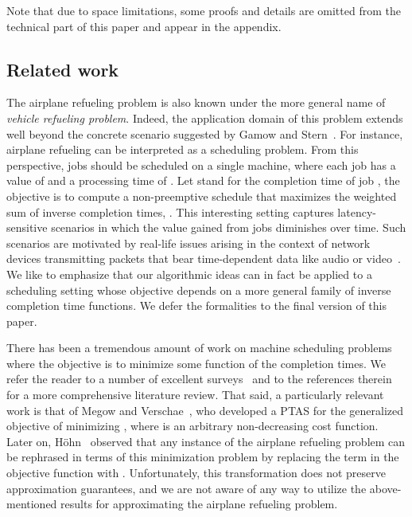 \documentclass[11pt]{article}
\theoremstyle{plain}
\theoremstyle{definition}
\begin{document}
Note that due to space limitations, some proofs and details are omitted from the technical part of this paper and appear in the appendix.

\subsection{Related work} \label{subsec:related_work}
The airplane refueling problem is also known under the more general name of \textit{vehicle refueling problem}. Indeed, the application domain of this problem extends well beyond the concrete scenario suggested by Gamow and Stern~\cite{GamowS58}. For instance, airplane refueling can be interpreted as a scheduling problem. From this perspective,  jobs should be scheduled on a single machine, where each job  has a value of  and a processing time of . Let  stand for the completion time of job , the objective is to compute a non-preemptive schedule that maximizes the weighted sum of inverse completion times, . This interesting setting captures latency-sensitive scenarios in which the value gained from jobs diminishes over time. Such scenarios are motivated by real-life issues arising in the context of network devices transmitting packets that bear
time-dependent data like audio or video~\cite{FiatMN08,FeldmanN10}. We like to emphasize that our algorithmic ideas can in fact be applied to a scheduling setting whose objective depends on a more general family of inverse completion time functions. We defer the formalities to the final version of this paper.

There has been a tremendous amount of work on machine scheduling problems where the objective is to minimize some function of the completion times. We refer the reader to a number of excellent surveys~\cite{ChekuriK04,Wiebke14} and to the references therein for a more comprehensive literature review. That said, a particularly relevant work is that of Megow and Verschae~\cite{MegowV13}, who developed a PTAS for the generalized objective of minimizing , where  is an arbitrary non-decreasing cost function. Later on, H{\"o}hn~\cite{Wiebke14} observed that any instance of the airplane refueling problem can be rephrased in terms of this minimization problem by replacing the term  in the objective function with . Unfortunately, this transformation does not preserve approximation guarantees, and we are not aware of any way to utilize the above-mentioned results for approximating the airplane refueling problem.
\end{document}
